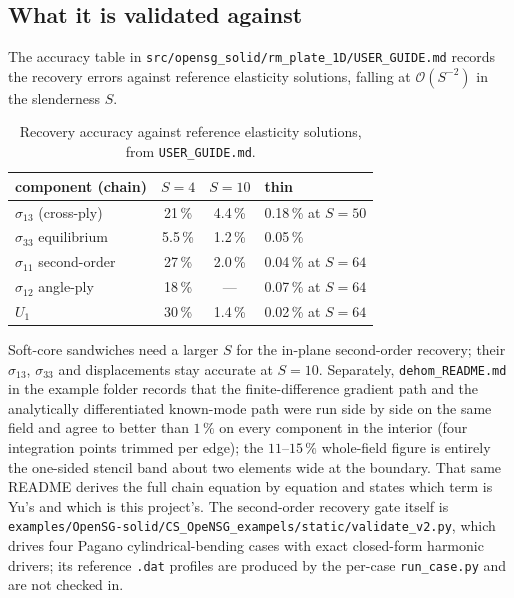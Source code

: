 \subsection{What it is validated against}

The accuracy table in
\texttt{src/opensg\_solid/rm\_plate\_1D/USER\_GUIDE.md} records the recovery
errors against reference elasticity solutions, falling at $\mathcal{O}(S^{-2})$
in the slenderness $S$.

\begin{table}[htbp]
\centering
\small
\begin{tabular}{lccl}
\toprule
component (chain) & $S = 4$ & $S = 10$ & thin \\
\midrule
$\sigma_{13}$ (cross-ply) & 21\,\% & 4.4\,\% & 0.18\,\% at $S = 50$ \\
$\sigma_{33}$ equilibrium & 5.5\,\% & 1.2\,\% & 0.05\,\% \\
$\sigma_{11}$ second-order & 27\,\% & 2.0\,\% & 0.04\,\% at $S = 64$ \\
$\sigma_{12}$ angle-ply & 18\,\% & --- & 0.07\,\% at $S = 64$ \\
$U_1$ & 30\,\% & 1.4\,\% & 0.02\,\% at $S = 64$ \\
\bottomrule
\end{tabular}
\caption{Recovery accuracy against reference elasticity solutions, from
\texttt{USER\_GUIDE.md}.}
\label{tab:solid-accuracy}
\end{table}

Soft-core sandwiches need a larger $S$ for the in-plane second-order recovery;
their $\sigma_{13}$, $\sigma_{33}$ and displacements stay accurate at $S = 10$.
Separately, \texttt{dehom\_README.md} in the example folder records that the
finite-difference gradient path and the analytically differentiated known-mode
path were run side by side on the same field and agree to better than
$1\,\%$ on every component in the interior (four integration points trimmed per
edge); the $11$--$15\,\%$ whole-field figure is entirely the one-sided stencil
band about two elements wide at the boundary. That same README derives the full
chain equation by equation and states which term is Yu's and which is this
project's. The second-order recovery gate itself is
\texttt{examples/OpenSG-solid/CS\_OpeNSG\_exampels/static/validate\_v2.py},
which drives four Pagano cylindrical-bending cases with exact closed-form
harmonic drivers; its reference \texttt{.dat} profiles are produced by the
per-case \texttt{run\_case.py} and are not checked in.

